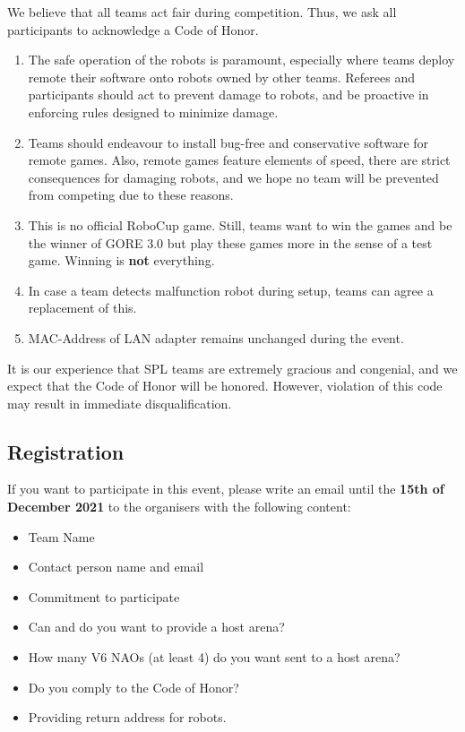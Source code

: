 We believe that all teams act fair during competition. Thus, we ask all participants to acknowledge a Code of Honor.
\begin{enumerate}
    \item The safe operation of the robots is paramount, especially where teams deploy remote their software onto robots owned by other teams. Referees and participants should act to prevent damage to robots, and be proactive in enforcing rules  designed to minimize damage.
    \item Teams should endeavour to install bug-free and conservative software for remote games. Also, remote games feature elements of speed, there are strict consequences for damaging robots, and we hope no team will be prevented from competing due to these reasons.
    \item This is no official RoboCup game. Still, teams want to win the games and be the winner of GORE 3.0 but play these games more in the sense of a test game. Winning is \textbf{not} everything.
    \item In case a team detects malfunction robot during setup, teams can agree a replacement of this.
    \item MAC-Address of LAN adapter remains unchanged during the event.
\end{enumerate} 

It is our experience that SPL teams are extremely gracious and congenial, and we expect that the Code of Honor will be honored. However, violation of this code may result in immediate disqualification.

\subsection{Registration}

If you want to participate in this event, please write an email until the \textbf{15th of December 2021} to the organisers with the following content:
\begin{itemize}
    \item Team Name
    \item Contact person name and email
    \item Commitment to participate
    \item Can and do you want to provide a host arena?
    \item How many V6 NAOs (at least 4) do you want sent to a host arena?
    \item Do you comply to the Code of Honor?
    \item Providing return address for robots.
\end{itemize}


